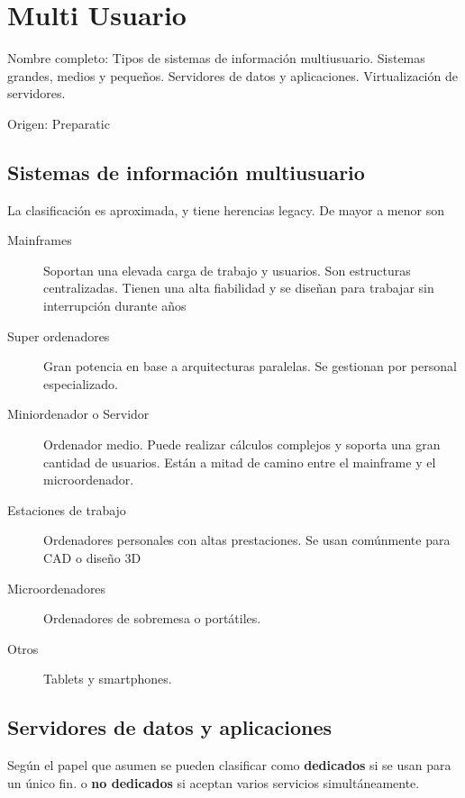 \setcounter{section}{56} %
\section{Multi Usuario}

Nombre completo: Tipos de sistemas de información multiusuario. Sistemas grandes, medios y pequeños. Servidores de datos y aplicaciones. Virtualización de servidores.

Origen: Preparatic

\localtableofcontents

\subsection{Sistemas de información multiusuario}
    La clasificación es aproximada, y tiene herencias legacy. De mayor a menor son

    \begin{description}
        \item[Mainframes] Soportan una elevada carga de trabajo y usuarios. Son estructuras centralizadas. Tienen una alta fiabilidad y se diseñan para trabajar sin interrupción durante años
        \item[Super ordenadores] Gran potencia en base a arquitecturas paralelas. Se gestionan por personal especializado.
        \item[Miniordenador o Servidor] Ordenador medio. Puede realizar cálculos complejos y soporta una gran cantidad de usuarios. Están a mitad de camino entre el mainframe y el microordenador.
        \item[Estaciones de trabajo] Ordenadores personales con altas prestaciones. Se usan comúnmente para CAD o diseño 3D
        \item[Microordenadores] Ordenadores de sobremesa o portátiles.
        \item[Otros] Tablets y smartphones.
    \end{description}

\subsection{Servidores de datos y aplicaciones}
    Según el papel que asumen se pueden clasificar como \textbf{dedicados} si se usan para un único fin. o \textbf{no dedicados} si aceptan varios servicios simultáneamente.

